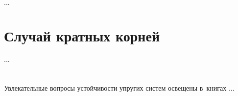 \begin{otherlanguage}{russian}
...



\section{Случай кратных корней}

...




\vspace{8mm}
\hfill\begin{minipage}[b]{0.95\linewidth}
\fontsize{10}{12}\selectfont

\section*{\wordforbibliography}

Увлекательные вопросы устойчивости упругих систем освещены в~книгах ...

\end{minipage}

\end{otherlanguage}
